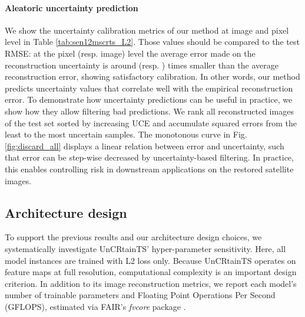 \documentclass[10pt,twocolumn,letterpaper]{article}
\newcommand{\figref}[1]{ Fig. \ref{#1}}
\newcommand{\tabref}[1]{ Table \ref{#1}}
\begin{document}
\paragraph{\bf Aleatoric uncertainty prediction} We show the uncertainty calibration metrics of our method at image and 
pixel level in\tabref{tab:sen12mscrts_L2}. Those values should be compared to the test RMSE: at the pixel (resp. image) level the average error made on the reconstruction uncertainty is around  (resp. ) times smaller than the average reconstruction error, showing satisfactory calibration. In other words, our method predicts uncertainty values that correlate well with the empirical reconstruction error. To demonstrate how uncertainty predictions can be useful in practice, we show how they allow filtering bad predictions.
We rank all reconstructed images of the test set sorted by increasing UCE and accumulate squared errors from the least to the most uncertain samples.
The monotonous curve in \figref{fig:discard_all} displays a linear relation between error and uncertainty, such that error can be step-wise decreased by uncertainty-based filtering. In practice, this enables controlling risk in downstream applications on the restored satellite images.




\subsection{Architecture design}
To support the previous results and our architecture design choices, we systematically investigate UnCRtainTS' hyper-parameter sensitivity. Here, all model instances are trained with L2 loss only. Because UnCRtainTS operates on feature maps at full resolution, computational complexity is an important design criterion. In addition to its image reconstruction metrics, we report each model's number of trainable parameters and Floating Point Operations Per Second (GFLOPS), estimated via FAIR's \textit{fvcore} package \cite{fvcore}.
\end{document}
